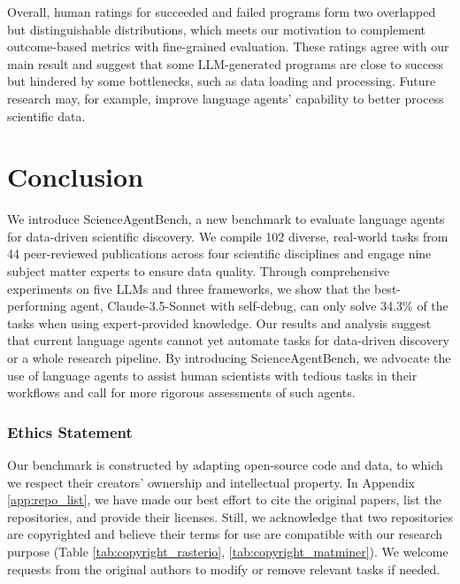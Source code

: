 \documentclass{article} %
\newcommand{\bench}{ScienceAgentBench\xspace}
\begin{document}
%
Overall, human ratings for succeeded and failed programs form two overlapped but distinguishable distributions, which meets our motivation to complement outcome-based metrics with fine-grained evaluation.
These ratings agree with our main result and suggest that some LLM-generated programs are close to success but hindered by some bottlenecks, such as data loading and processing.
Future research may, for example, improve language agents' capability to better process scientific data.
%

\vspace{-5.5pt}
\section{Conclusion}
\label{sec:conclusion}
\vspace{-5.5pt}

%
We introduce \bench, a new benchmark to evaluate language agents for data-driven scientific discovery.
We compile 102 diverse, real-world tasks from 44 peer-reviewed publications across four scientific disciplines and engage nine subject matter experts to ensure data quality.
Through comprehensive experiments on five LLMs and three frameworks, we show that the best-performing agent, Claude-3.5-Sonnet with self-debug, can only solve 34.3\% of the tasks when using expert-provided knowledge.
Our results and analysis suggest that current language agents cannot yet automate tasks for data-driven discovery or a whole research pipeline.
By introducing \bench, we advocate the use of language agents to assist human scientists with tedious tasks in their workflows and call for more rigorous assessments of such agents.
%

\subsubsection*{Ethics Statement}
Our benchmark is constructed by adapting open-source code and data, to which we respect their creators' ownership and intellectual property.
In Appendix \ref{app:repo_list}, we have made our best effort to cite the original papers, list the repositories, and provide their licenses.
Still, we acknowledge that two repositories are copyrighted and believe their terms for use are compatible with our research purpose (Table \ref{tab:copyright_rasterio}, \ref{tab:copyright_matminer}).
We welcome requests from the original authors to modify or remove relevant tasks if needed.
\end{document}
